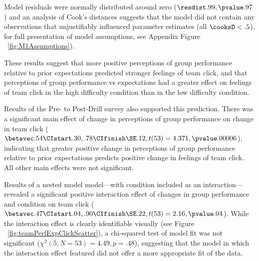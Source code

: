 Model residuals were normally distributed around zero ($\resdist .99, \pvalue .97 $) and an analysis of Cook's distances suggests that the model did not contain any observations that unjustifiably influenced parameter estimates (all $\cooksD < .5$), for full presentation of model assumptions, see Appendix Figure ~\ref{fig:M1Assumptions}).

These results suggest that more positive perceptions of group performance relative to prior expectations predicted stronger feelings of team click, and that perceptions of group performance vs expectations had a greater effect on feelings of team click in the high difficulty condition than in the low difficulty condition.





Results of the Pre- to Post-Drill survey also supported this prediction.  There was a significant main effect of change in perceptions of group performance on change in team click ($\betavec .54 \CIstart .30, .78 \CIfinish \SE .12, t(53) = 4.371, \pvalue .00006$), indicating that greater positive change in perceptions of group performance relative to prior expectations predicts positive change in feelings of team click.  All other main effects were not significant.

Results of a nested model model---with condition included as an interaction---revealed a significant positive interaction effect of changes in group performance and condition on team click ($\betavec .47 \CIstart .04, .90 \CIfinish \SE .22, t(53) = 2.16, \pvalue .04 $).  While the interaction effect is clearly identifiable visually (see Figure ~\ref{fig:teamPerfExpClickScatter}),
a chi-squared test of model fit was not significant ($\chi^2 (5, N = 53) = 4.49, p = .48$), suggesting that the model in which the interaction effect featured did not offer a more appropriate fit of the data.

